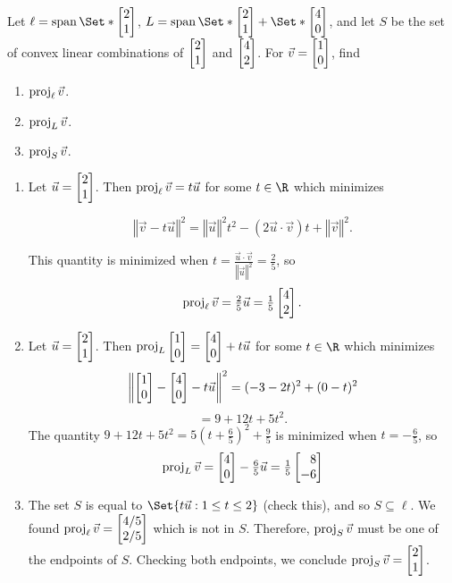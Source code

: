 \begin{exercises}
\begin{problist}
\prob
Let $\ell=\Span \Set*{ \mat{2 \\ 1}}$, $L=\Span \Set*{ \mat{2 \\ 1}}+\Set*{\mat{4\\0}}$, 
		and let $S$ be the set of convex linear combinations of $\mat{2 \\ 1}$ and $\mat{4 \\ 2}$. For $\vec v = \mat{ 1 \\ 0}$, find
\begin{enumerate}
	\item $\operatorname{proj}_\ell \vec v$.
	\item $\operatorname{proj}_L \vec v$.
	\item $\operatorname{proj}_S \vec v$.
\end{enumerate}
		\begin{solution}
			\begin{enumerate}
				\item Let $\vec u=\mat{ 2 \\ 1 }$. Then $\operatorname{proj}_\ell \vec v=t\vec u$ for some $t\in \R$ which minimizes 
	
	\[\left \Vert \vec v - t \vec u \right \Vert^2 = \left \Vert \vec u \right \Vert^2 t^2 - (2 \vec u \cdot \vec v) t + \left \Vert \vec v \right \Vert^2.\]
	
This quantity is minimized when $t = \frac{\vec u \cdot \vec v}{\left \Vert \vec u \right \Vert^2} = \frac{2}{5}$,
so
\[
\Proj_\ell \vec v = \tfrac{2}{5} \vec u=\tfrac 15 \mat{4\\2}.
\]

	\item Let $\vec u=\mat{ 2 \\ 1 }$. Then $\Proj_L \mat{ 1 \\ 0}=\mat{4\\0}+t\vec u$ for some $t\in \R$ 
		which minimizes \[\left \Vert \mat{ 1 \\ 0}  - \mat{4\\0}-t \vec u \right \Vert^2 = (-3-2t)^2+(0-t)^2\]\[ = 9+12t+5t^2.\]
	The quantity $9+12t+5t^2=5(t+\frac 65 )^2+\frac 95$ is minimized when $t = -\frac 65$,
	so 
	\[
	\Proj_L \vec v = \mat{4\\0}-\tfrac 65\vec u=\tfrac 15 \mat{8\\-6}
	\]
\item The set $S$ is equal to $\Set{t \vec u: 1 \leq t \leq 2}$ (check this),
	and so $S\subseteq \ell$. We found $\Proj_\ell\vec v=\mat{4/5\\2/5}$ which is not in $S$. Therefore,
	$\operatorname{proj}_S\vec v$ must be one of the endpoints of $S$. Checking both endpoints, we conclude
 $\Proj_S \vec v = \mat{2 \\ 1}$.
	\end{enumerate}
		\end{solution}


\end{problist}
\end{exercises}
